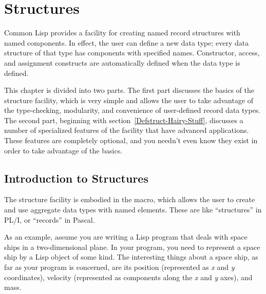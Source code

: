 
\clearpage\def\pagestatus{FINAL PROOF}

\chapter{Structures}

Common Lisp provides a facility for creating named record structures
with named components.  In effect, the user can define a new data type;
every data structure of that type has components with specified names.
Constructor, access, and assignment constructs are automatically
defined when the data type is defined.

This chapter is divided into two parts.  The first part discusses
the basics of the structure facility, which is very simple and allows
the user to take advantage of the type-checking, modularity, and
convenience of user-defined record data types.  The second part,
beginning with section~\ref{Defstruct-Hairy-Stuff},
discusses a number of specialized features of the facility that
have advanced applications.  These features are completely optional,
and you needn't even know they exist in order to take
advantage of the basics.

\section{Introduction to Structures}
\label{DEFSTRUCT-INTRO-SECTION}

The structure facility is embodied in the  macro,
which allows the user to create and use
aggregate data types with named elements.  These are like
``structures'' in {PL/I}, or ``records'' in Pascal.

As an example, assume you are writing a Lisp
program that deals with space ships in a two-dimensional plane.
In your program, you need to
represent a space ship by a Lisp object of some kind.  The interesting
things about a space ship, as far as your program is concerned, are
its position (represented as {\it x} and {\it y} coordinates),
velocity (represented as components along the {\it x} and {\it y} axes), and mass.

